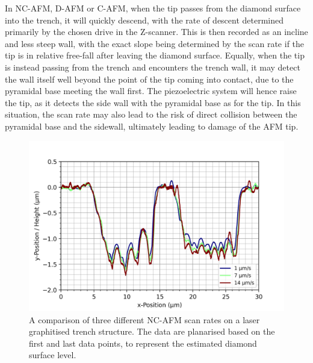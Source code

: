 \begin{refsection}
In NC-AFM, D-AFM or C-AFM, when the tip passes from the diamond surface into the trench, it will quickly descend, with the rate of descent determined primarily by the chosen drive in the Z-scanner. This is then recorded as an incline and less steep wall, with the exact slope being determined by the scan rate if the tip is in relative free-fall after leaving the diamond surface. Equally, when the tip is instead passing from the trench and encounters the trench wall, it may detect the wall itself well beyond the point of the tip coming into contact, due to the pyramidal base meeting the wall first. The piezoelectric system will hence raise the tip, as it detects the side wall with the pyramidal base as for the tip. In this situation, the scan rate may also lead to the risk of direct collision between the pyramidal base and the sidewall, ultimately leading to damage of the AFM tip.

\begin{figure}[H]
    \centering
    \includegraphics[width=\textwidth]{Chapter7/Figs/Raster/jet_legend_um.png}
    \caption{A comparison of three different NC-AFM scan rates on a laser graphitised trench structure. The data are planarised based on the first and last data points, to represent the estimated diamond surface level.}
    \label{fig:afm_scan_rate_small}
\end{figure}


\end{refsection}
